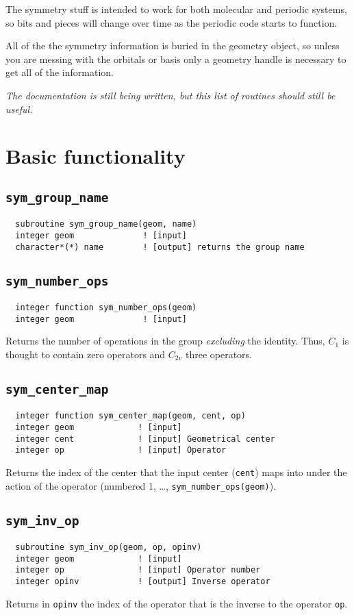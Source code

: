 
  The symmetry stuff is intended to work for both molecular and
periodic systems, so bits and pieces will change over time as the
periodic code starts to function.

  All of the the symmetry information is buried in the geometry
object, so unless you are messing with the orbitals or basis only a
geometry handle is necessary to get all of the information.

{\em The documentation is still being written, but this list of
  routines should still be useful.}

\section{Basic functionality}

\subsection{{\tt sym\_group\_name}}
\begin{verbatim}
  subroutine sym_group_name(geom, name)
  integer geom              ! [input]
  character*(*) name        ! [output] returns the group name
\end{verbatim}

\subsection{{\tt sym\_number\_ops}}
\begin{verbatim}
  integer function sym_number_ops(geom)
  integer geom              ! [input]
\end{verbatim}
Returns the number of operations in the group {\em excluding} the
identity.  Thus, $C_1$ is thought to contain zero operators and
$C_{2v}$ three operators.

\subsection{{\tt sym\_center\_map}}
\begin{verbatim}
  integer function sym_center_map(geom, cent, op)
  integer geom             ! [input]
  integer cent             ! [input] Geometrical center
  integer op               ! [input] Operator
\end{verbatim}
Returns the index of the center that the input center
(\verb+cent+) maps into under the action of the operator
(numbered 1, \ldots, \verb+sym_number_ops(geom)+).

\subsection{{\tt sym\_inv\_op}}
\label{sec:syminvop}
\begin{verbatim}
  subroutine sym_inv_op(geom, op, opinv)
  integer geom             ! [input]
  integer op               ! [input] Operator number
  integer opinv            ! [output] Inverse operator
\end{verbatim}
Returns in \verb+opinv+ the index of the operator that is
the inverse to the operator \verb+op+.

